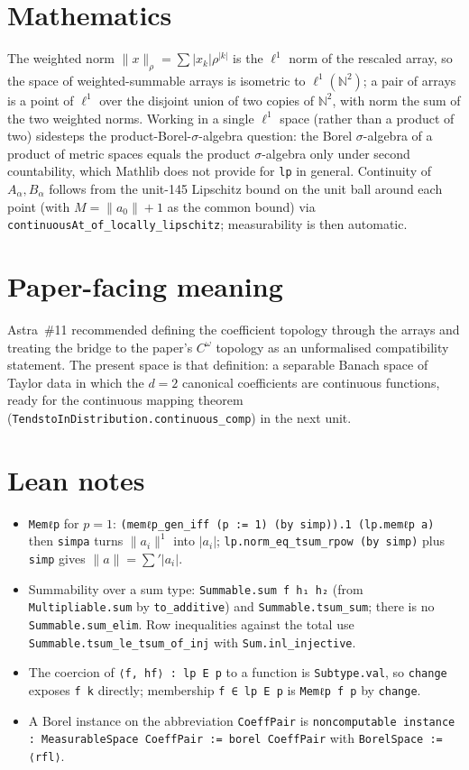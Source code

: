 \documentclass[11pt]{article}
\begin{document}
\section{Mathematics}
The weighted norm $\|x\|_\rho=\sum|x_k|\rho^{|k|}$ is the $\ell^1$ norm of the rescaled array, so
the space of weighted-summable arrays is isometric to $\ell^1(\mathbb N^2)$; a pair of arrays is a
point of $\ell^1$ over the disjoint union of two copies of $\mathbb N^2$, with norm the sum of the
two weighted norms. Working in a single $\ell^1$ space (rather than a product of two) sidesteps the
product-Borel-$\sigma$-algebra question: the Borel $\sigma$-algebra of a product of metric spaces
equals the product $\sigma$-algebra only under second countability, which Mathlib does not provide
for \texttt{lp} in general. Continuity of $A_\alpha,B_\alpha$ follows from the unit-145 Lipschitz
bound on the unit ball around each point (with $M=\|a_0\|+1$ as the common bound) via
\texttt{continuousAt\_of\_locally\_lipschitz}; measurability is then automatic.

\section{Paper-facing meaning}
Astra~\#11 recommended defining the coefficient topology through the arrays and treating the bridge
to the paper's $C^\omega$ topology as an unformalised compatibility statement. The present space is
that definition: a separable Banach space of Taylor data in which the $d=2$ canonical coefficients
are continuous functions, ready for the continuous mapping theorem
(\texttt{TendstoInDistribution.continuous\_comp}) in the next unit.

\section{Lean notes}
\begin{itemize}
\item \texttt{Memℓp} for $p=1$: \texttt{(memℓp\_gen\_iff (p := 1) (by simp)).1 (lp.memℓp a)} then
\texttt{simpa} turns $\|a_i\|^{1}$ into $|a_i|$; \texttt{lp.norm\_eq\_tsum\_rpow (by simp)} plus
\texttt{simp} gives $\|a\|=\sum'|a_i|$.
\item Summability over a sum type: \texttt{Summable.sum f h₁ h₂} (from
\texttt{Multipliable.sum} by \texttt{to\_additive}) and \texttt{Summable.tsum\_sum}; there is no
\texttt{Summable.sum\_elim}. Row inequalities against the total use
\texttt{Summable.tsum\_le\_tsum\_of\_inj} with \texttt{Sum.inl\_injective}.
\item The coercion of \texttt{⟨f, hf⟩ : lp E p} to a function is \texttt{Subtype.val}, so
\texttt{change} exposes \texttt{f k} directly; membership \texttt{f ∈ lp E p} is
\texttt{Memℓp f p} by \texttt{change}.
\item A Borel instance on the abbreviation \texttt{CoeffPair} is
\texttt{noncomputable instance : MeasurableSpace CoeffPair := borel CoeffPair} with
\texttt{BorelSpace := ⟨rfl⟩}.
\end{itemize}
\end{document}
